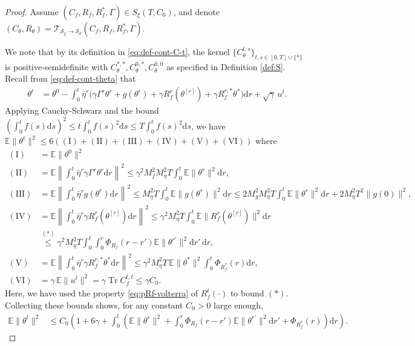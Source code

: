 \documentclass[10pt,a4paper]{amsart}
\def\Cf{C_f}
\def\E{\mathbb{E}}
\def\Rf{R_f}
\def\Tr{\operatorname{Tr}}
\def\d{\mathrm{d}}
\def\nI{(\mathrm{I})}
\def\nII{(\mathrm{II})}
\def\nIII{(\mathrm{III})}
\def\nIV{(\mathrm{IV})}
\def\nV{(\mathrm{V})}
\def\nVI{(\mathrm{VI})}
\newcommand{\norm}[1]{\|#1\|}
\def\pRf{\Phi_{\Rf}}
\def\trsfrmA{\mathcal{T}_{\mathcal{S}_\xi \to {\mathcal{S}}_\theta}}
\begin{document}
\begin{proof}
Assume $(C_f,R_f,R_f^*,\Gamma) \in S_\xi(T,C_0)$, and denote
$(C_\theta,R_\theta)=\trsfrmA(C_f,R_f,R_f^*,\Gamma)$.

We note that by its definition in \eqref{eq:def-cont-C-t},
the kernel
$\{C_\theta^{t,s}\}_{t,s \in [0,T] \cup \{*\}}$ is positive-semidefinite 
with $C_\theta^{*,*},C_\theta^{0,*},C_\theta^{0,0}$ as specified in Definition
\ref{def:S}. Recall from \eqref{eq:def-cont-theta} that
\begin{align}\label{eq:bound-theta-second-moment-1}
    \theta^t&=\theta^0-\int_0^t \bar\eta^r \Big({\gamma}\Gamma^r
\theta^r+g(\theta^r)+{\gamma}R_f^{r}(\theta^{[r]})+
{\gamma}R_f^{r,*}\theta^*\Big)\d r+\sqrt{\gamma}\,u^t.
\end{align}
Applying Cauchy-Schwarz and the bound $(\int_0^t f(s)\d s)^2 \leq t\int_0^t
f(s)^2 \d s \leq T\int_0^t f(s)^2 \d s$, we have $\E\|\theta^t\|^2 \leq
6(\nI+\nII+\nIII+\nIV+\nV+\nVI)$ where
\begin{align*}
\nI&=\E\|\theta^0\|^2\\
\nII&=\E\left\|\int_0^t
\bar\eta^r\gamma\Gamma^r\theta^r \d r\right\|^2
\leq \gamma^2 M_f^2 M_\eta^2 T\int_0^t \E\norm{\theta^r}^2 \d r,\\
\nIII&=\E\left\|\int_0^t \bar\eta^r g(\theta^r) \d
r\right\|^2\leq M_\eta^2 T\int_0^t \E\|g(\theta^r)\|^2 \d r
    \leq 2M_g^2 M_\eta^2 T\int_0^t \E\norm{\theta^r}^2\d r
+2M_\eta^2 T^2\norm{g(0)}^2,\,\\
\nIV&=\E\left\|\int_0^t \bar\eta^r\gamma
R_f^{r}(\theta^{[r]}) \d r\right\|^2 \leq \gamma^2 M_\eta^2 T\int_0^t \E\norm{R_f^{r}(\theta^{[r]})}^2 \d r\\
    &\overset{(*)}{\leq} \gamma^2 M_\eta^2 T\int_0^t
\int_0^r \pRf(r-r')\E \|\theta^{r'}\|^2\d r'\,\d r,\\
\nV&=\E\left\|\int_0^t \bar\eta^r \gamma R_f^{r,*}\theta^*
\d r\right\|^2
    \leq \gamma^2 M_\eta^2 T\,\E\norm{\theta^*}^2
\int_0^t \Phi_{R_f^*}(r)\d r,\\
\nVI&=\gamma\,\E\norm{u^t}^2=\gamma \Tr \Cf^{t,t} \leq \gamma C_0.
\end{align*}
Here, we have used the property \eqref{eq:pRf-volterra} of $R_f^t(\cdot)$
to bound $(*)$.
Collecting these bounds shows, for any constant $C_0>0$ large enough,
\begin{align*}
\E\|\theta^t\|^2&\leq C_0\left(1+6\gamma+\int_0^t \left(\E\|\theta^r\|^2
+\int_0^r \Phi_{R_f}(r-r')\E\|\theta^{r'}\|^2\d r'+\Phi_{R_f^*}(r) \right)\d
r\right).
\end{align*}

\end{proof}
\end{document}
